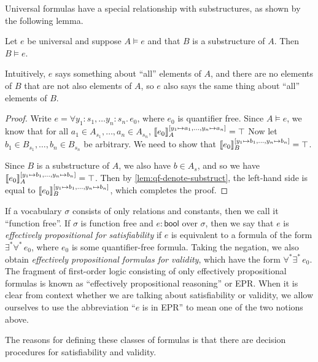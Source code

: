 Universal formulas have a special relationship with substructures, as shown by the following lemma.
\begin{lemma}\label{lem:univ-model-substruct}
  Let $e$ be universal and suppose $A\models e$ and that $B$ is a substructure of $A$.
  Then $B\models e$.

  Intuitively, $e$ says something about ``all'' elements of $A$, and
  there are no elements of $B$ that are not also elements of $A$, so
  $e$ also says the same thing about ``all'' elements of $B$.
\end{lemma}
\begin{proof}
  Write $e = \forall y_1 : s_1,\dots y_n : s_n.\, e_0$, where $e_0$ is quantifier free.
  Since $A\models e$, we know that for all $a_1\in A_{s_1}, \dots, a_n\in A_{s_n}$,
  $\llbracket{e_0}\rrbracket_A^{[y_1\mapsto a_1, \dots, y_n\mapsto a_n]} = \top$
  Now let $b_1\in B_{s_1}, \dots, b_n\in B_{s_n}$ be arbitrary.
  We need to show that $\llbracket{e_0}\rrbracket_B^{[y_1\mapsto b_1, \dots, y_n\mapsto b_n]} = \top$.

  Since $B$ is a substructure of $A$, we also have $b\in A_s$,
  and so we have $\llbracket{e_0}\rrbracket_A^{[y_1\mapsto b_1, \dots, y_n\mapsto b_n]} = \top$.
  Then by \cref{lem:qf-denote-substruct}, the left-hand side is equal to
  $\llbracket{e_0}\rrbracket_B^{[y_1\mapsto b_1, \dots, y_n\mapsto b_n]}$, which completes the proof.
\end{proof}


%
If a vocabulary $\sigma$ consists of only relations and constants,
  then we call it ``function free''.
If $\sigma$ is function free and $e : \mathsf{bool}$ over $\sigma$,
  then we say that $e$ is \emph{effectively propositional for satisfiability}
  if $e$ is equivalent to a formula of the form $\exists^*\forall^*\, e_0$,
  where $e_0$ is some quantifier-free formula.
Taking the negation, we also obtain \emph{effectively propositional formulas for validity},
  which have the form $\forall^*\exists^*\, e_0$.
The fragment of first-order logic consisting of only effectively propositional formulas
  is known as ``effectively propositional reasoning'' or EPR.
When it is clear from context whether we are talking about satisfiability or validity,
  we allow ourselves to use the abbreviation ``$e$ is in EPR'' to mean one of the two notions above.

The reasons for defining these classes of formulas is that there are
  decision procedures for satisfiability and validity.

